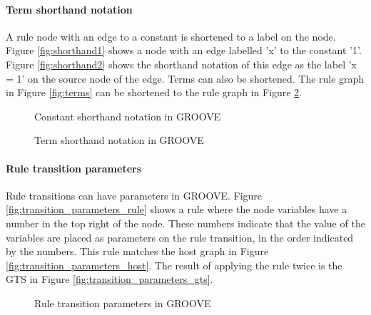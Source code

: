 \paragraph*{Term shorthand notation}
A rule node with an edge to a constant is shortened to a label on the node. Figure \ref{fig:shorthand1} shows a node with an edge labelled 'x' to the constant '1'. Figure \ref{fig:shorthand2} shows the shorthand notation of this edge as the label 'x = 1' on the source node of the edge. Terms can also be shortened. The rule graph in Figure \ref{fig:terms} can be shortened to the rule graph in Figure \ref{fig:term_shorthand}.

\begin{figure}[h]
  \begin{center}
    \hspace{20px}
  \end{center}
  \caption{Constant shorthand notation in GROOVE}
  \label{fig:shorthand}
\end{figure}

\begin{figure}[h]
  \begin{center}
    
  \end{center}
  \caption{Term shorthand notation in GROOVE}
  \label{fig:term_shorthand}
\end{figure}

\paragraph*{Rule transition parameters}
Rule transitions can have parameters in GROOVE. Figure \ref{fig:transition_parameters_rule} shows a rule where the node variables have a number in the top right of the node. These numbers indicate that the value of the variables are placed as parameters on the rule transition, in the order indicated by the numbers. This rule matches the host graph in Figure \ref{fig:transition_parameters_host}. The result of applying the rule twice is the GTS in Figure \ref{fig:transition_parameters_gts}.

\begin{figure}[h]
  \begin{center}
    \hspace{20px}
    \hspace{20px}
    \subfloat[GTS]{\label{fig:transition_parameters_gts}}
  \end{center}
  \caption{Rule transition parameters in GROOVE}
  \label{fig:transition_parameters}
\end{figure}

